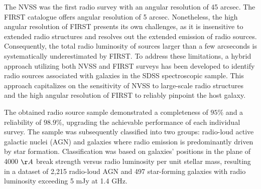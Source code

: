 The NVSS was the first radio survey with an angular resolution of 45 arcsec. 
The FIRST catalogue offers angular resolution of 5 arcsec. Nonetheless, the high angular resolution of FIRST presents its own challenges, as it is insensitive to extended radio structures and resolves out the extended emission of radio sources. Consequently, the total radio luminosity of sources larger than a few arcseconds is systematically underestimated by FIRST. To address these limitations, a hybrid approach utilizing both NVSS and FIRST surveys has been developed to identify radio sources associated with galaxies in the SDSS spectroscopic sample. This approach capitalizes on the sensitivity of NVSS to large-scale radio structures and the high angular resolution of FIRST to reliably pinpoint the host galaxy.

The obtained radio source sample demonstrated a completeness of $95\%$ and a reliability of $98.9\%$, upgrading the achievable performance of each individual survey. The sample was subsequently classified into two groups: radio-loud active galactic nuclei (AGN) and galaxies where radio emission is predominantly driven by star formation. Classification was based on galaxies' positions in the plane of 4000 $\AA$ break strength versus radio luminosity per unit stellar mass, resulting in a dataset of 2,215 radio-loud AGN and 497 star-forming galaxies with radio luminosity exceeding 5 mJy at 1.4 GHz. \cite{2005MNRAS.362....9B, 10.1111/j.1365-2966.2005.09192.x}

